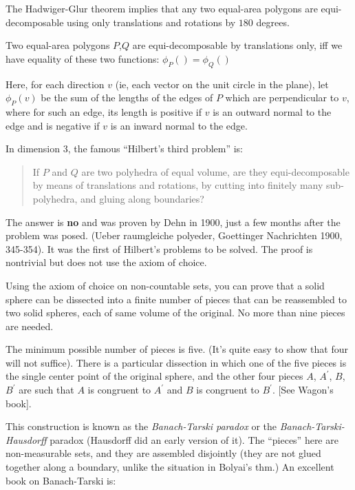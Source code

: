 The Hadwiger-Glur theorem implies that any two equal-area polygons are
equi-decomposable using only translations and rotations by $180$
degrees.

\begin{teo}
  Two equal-area polygons $P$,$Q$ are equi-decomposable by translations
  only, iff we have equality of these two functions: $\phi_P() =
  \phi_Q()$
\end{teo}
Here, for each direction $v$ (ie, each vector on the unit circle in the
plane), let $\phi_P(v)$ be the sum of the lengths of the edges of $P$
which are perpendicular to $v$, where for such an edge, its length is
positive if $v$ is an outward normal to the edge and is negative if $v$
is an inward normal to the edge.


In dimension 3, the famous ``Hilbert's third problem'' is:
\begin{quote}
  If $P$ and $Q$ are two polyhedra of equal volume, are they
  equi-decomposable by means of translations and rotations, by cutting
  into finitely many sub-polyhedra, and gluing along boundaries?
\end{quote}

The answer is {\bf no} and was proven by Dehn in 1900, just a few months
after the problem was posed. (Ueber raumgleiche polyeder, Goettinger
Nachrichten 1900, 345-354). It was the first of Hilbert's problems to be
solved. The proof is nontrivial but does not use the axiom of choice.

\Ref


Using the axiom of choice on non-countable sets, you can prove that a
solid sphere can be dissected into a finite number of pieces that can be
reassembled to two solid spheres, each of same volume of the
original. No more than nine pieces are needed.

The minimum possible number of pieces is five.  (It's quite easy to show
that four will not suffice).  There is a particular dissection in which
one of the five pieces is the single center point of the original
sphere, and the other four pieces $A$, $A^\prime$, $B$, $B^\prime$ are
such that $A$ is congruent to $A^\prime$ and $B$ is congruent to
$B^\prime$.  [See Wagon's book].

This construction is known as the {\em Banach-Tarski paradox} or the
{\em Banach-Tarski-Hausdorff} paradox (Hausdorff did an early version of
it).  The ``pieces'' here are non-measurable sets, and they are
assembled disjointly (they are not glued together along a boundary,
unlike the situation in Bolyai's thm.)  An excellent book on
Banach-Tarski is:


